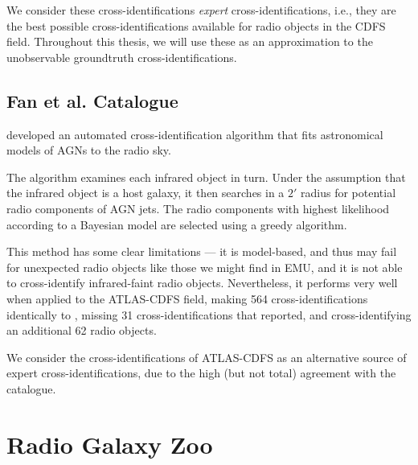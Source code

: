             We consider these cross-identifications \emph{expert}
            cross-identifications, i.e., they are the best possible
            cross-identifications available for radio objects in the CDFS field.
            Throughout this thesis, we will use these as an approximation to the
            unobservable groundtruth cross-identifications.

        \subsection{Fan et al. Catalogue}
        \label{sec:fan}

            \citet{fan15} developed an automated cross-identification algorithm
            that fits astronomical models of AGNs to the radio sky.

            The algorithm examines each infrared object in turn. Under the
            assumption that the infrared object is a host galaxy, it then
            searches in a $2'$ radius for potential radio components of AGN
            jets. The radio components with highest likelihood according to a
            Bayesian model are selected using a greedy algorithm.

            This method has some clear limitations --- it is model-based, and
            thus may fail for unexpected radio objects like those we might find
            in EMU, and it is not able to cross-identify infrared-faint radio
            objects. Nevertheless, it performs very well when applied to the
            ATLAS-CDFS field, making 564 cross-identifications identically to
            \citeauthor{norris06}, missing 31 cross-identifications that
            \citeauthor{norris06} reported, and cross-identifying an additional
            62 radio objects.

            We consider the \citeauthor{fan15} cross-identifications of
            ATLAS-CDFS as an alternative source of expert cross-identifications,
            due to the high (but not total) agreement with the
            \citeauthor{norris06} catalogue.

    \section{Radio Galaxy Zoo}
    \label{sec:radio-galaxy-zoo}


